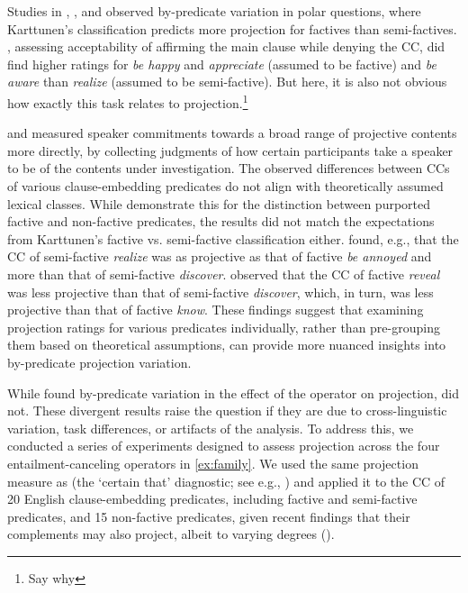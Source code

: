 \documentclass[a4paper,12pt,twoside]{article}
\begin{document}
	Studies in \citet{djarv_cognitive_2018}, \citet{tonhauser_how_2018}, and \citet{degen_are_2022} observed by-predicate variation in polar questions, where Karttunen's classification predicts more projection for factives than semi-factives.
	\citet{djarv_cognitive_2018}, assessing acceptability of affirming the main clause while denying the CC, did find higher ratings for \emph{be happy} and \emph{appreciate} (assumed to be factive) and \emph{be aware} than \emph{realize} (assumed to be semi-factive). But here, it is also not obvious how exactly this task relates to projection.\footnote{Say why}
	
	\citet{tonhauser_how_2018} and \citet{degen_are_2022} measured speaker commitments towards a broad range of projective contents more directly, by collecting judgments of how certain participants take a speaker to be of the contents under investigation.
	The observed differences between CCs of various clause-embedding predicates do not align with theoretically assumed lexical classes. While \citet{degen_are_2022} demonstrate this for the distinction between purported factive and non-factive predicates, the results did not match the expectations from Karttunen's factive vs. semi-factive classification either.
	\citet{tonhauser_how_2018} found, e.g., that the CC of semi-factive \emph{realize} was as projective as that of factive \emph{be annoyed} and more than that of semi-factive \emph{discover}. \citet{degen_are_2022} observed that the CC of factive \textit{reveal} was less projective than that of semi-factive \textit{discover}, which, in turn, was less projective than that of factive \textit{know}. These findings suggest that examining projection ratings for various predicates individually, rather than pre-grouping them based on theoretical assumptions, can provide more nuanced insights into by-predicate projection variation.

	While \citet{smith_relationship_2014} found by-predicate variation in the effect of the operator on projection, \citet{sieker_projective_2022} did not.
	These divergent results raise the question if they are due to cross-linguistic variation, task differences, or artifacts of the analysis. To address this, we conducted a series of experiments designed to assess projection across the four entailment-canceling operators in \ref{ex:family}. We used the same projection measure as \citet{sieker_projective_2022} (the `certain that' diagnostic; see e.g., \citealp{tonhauser_how_2018,djarv_prosodic_2017,mahler_social_2020}) and applied it to the CC of 20 English clause-embedding predicates, including factive and semi-factive predicates, and 15 non-factive predicates, given recent findings that their complements may also project, albeit to varying degrees (\citealt{degen_are_2022}).
\end{document}
